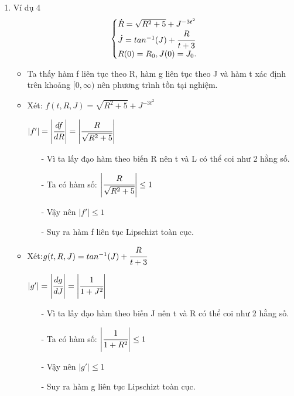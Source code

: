 \documentclass[a4paper]{article}
\begin{document}
\begin{enumerate}
        \item Ví dụ 4 $$\left\{\begin{array}{@{}l@{}}
        \dot{R} = \sqrt{R^2+5} + J^{-3t^2} \\
        \dot{J} =  tan^{-1}(J)+\cfrac{R}{t+3} \\[5pt]
        R(0) = R_{0}, J(0) = J_{0}.
        \end{array}\right.$$
        \begin{itemize}
            \item Ta thấy hàm f liên tục theo R, hàm g liên tục theo J và hàm t xác định trên khoảng $[0,\infty)$ nên phương trình tồn tại nghiệm.
            \item Xét: $f(t,R,J) = \sqrt{R^2+5} + J^{-3t^2}$ 
            \begin{center}
                $|f'| = \left|\cfrac{df}{dR}\right| = \left|\cfrac{R}{\sqrt{R^2+5}}\right| $\\
            \end{center}
            \begin{itemize}
                \item[-] Vì ta lấy đạo hàm theo biến R nên t và L có thể coi như 2 hằng số.
                \item[-] Ta có hàm số: $\left|\cfrac{R}{\sqrt{R^2+5}}\right| \leq 1$
                \item[-] Vậy nên $\left|f'\right| \leq 1$
                \item[-] Suy ra hàm f liên tục Lipschizt toàn cục.
            \end{itemize}
            \item Xét:$g(t,R,J) = tan^{-1}(J)+\cfrac{R}{t+3}$
            \begin{center}
                $|g'| = \left|\cfrac{dg}{dJ}\right| = \left|\cfrac{1}{1+J^2}\right|$\\
            \end{center}
            \begin{itemize}
                \item[-] Vì ta lấy đạo hàm theo biến J nên t và R có thể coi như 2 hằng số.
                \item[-] Ta có hàm số: $\left|\cfrac{1}{1+R^2}\right| \leq 1$
                \item[-] Vậy nên $\left|g'\right| \leq 1$
                \item[-] Suy ra hàm g liên tục Lipschizt toàn cục.
            \end{itemize}
        \end{itemize}


\end{enumerate}
\end{document}
